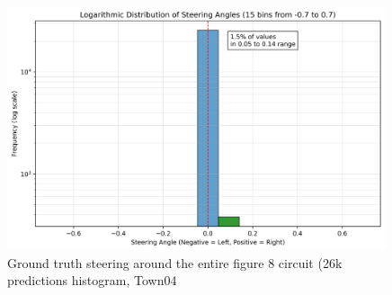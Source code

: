 \begin{figure}[h]
    \centering
    \includegraphics[width=0.99\textwidth]{Figures/Methods/steering_histogram_log.png}
    \caption{Ground truth steering around the entire figure 8 circuit (26k predictions histogram, Town04}
    \label{fig:/steering_histogram_log}
\end{figure}








